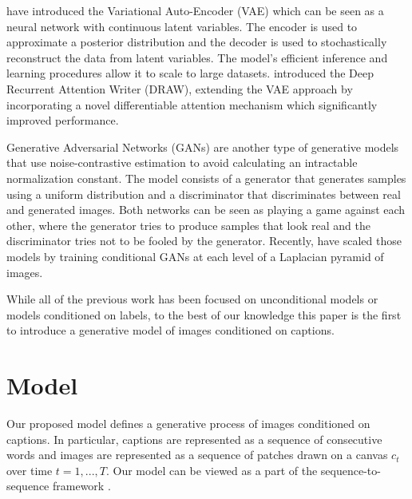 \documentclass{article} %
\newcommand{\icaption}{{\bf{y}}}
\newcommand{\oimage}{{\bf{x}}}
\begin{document}
\cite{kingma_vae} have introduced the Variational Auto-Encoder (VAE) which can be seen as a neural network with continuous latent variables. The encoder is used to approximate a posterior distribution and the decoder is used to stochastically reconstruct the data from latent variables. The model's efficient inference and learning procedures allow it to scale to large datasets. 
\cite{gregor_draw} introduced the Deep Recurrent Attention Writer (DRAW), extending the VAE approach by incorporating a novel differentiable attention mechanism which significantly improved performance.%

Generative Adversarial Networks (GANs) \citep{goodfellow_gan} are another type of generative models that use noise-contrastive estimation \citep{gutmann_nce} to avoid calculating an intractable normalization constant. The model consists of a generator that generates samples using a uniform distribution and a discriminator that discriminates between real and generated images. 
Both networks can be seen as playing a game against each other, where the generator tries to produce samples that look real and the discriminator tries not to be fooled by the generator. 
Recently, \cite{denton_lapgan} have scaled those models by training conditional GANs at each level of a Laplacian pyramid of images. 

While all of the previous work has been focused on unconditional models or models conditioned on labels, to the best of our knowledge this paper is the first to introduce a generative model of images conditioned on captions.

\section{Model}
\label{sec:model}
Our proposed model 
defines a generative process of images conditioned on captions. In particular, captions are represented as a sequence of consecutive words and images are represented as a sequence of patches drawn on a canvas $c_t$ over time $t=1,...,T$. Our model can be viewed as a part of the sequence-to-sequence framework \citep{ilya_mt,cho_mt,nitish_video}.
\end{document}

